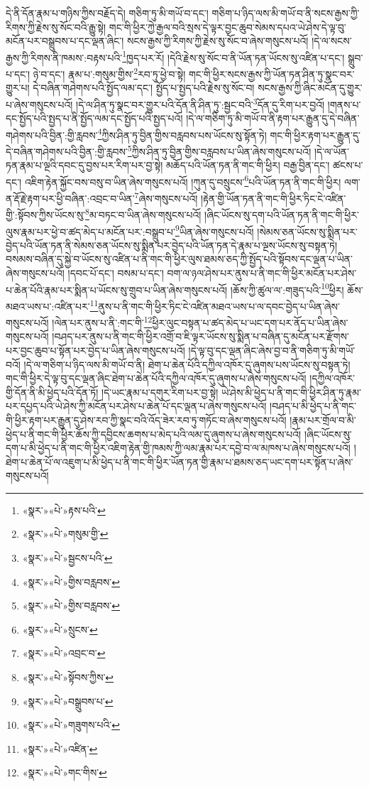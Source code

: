 དེ་ནི་དོན་རྣམ་པ་གཉིས་ཀྱིས་བརྗོད་དེ། གཅིག་ཏུ་མི་གཡོ་བ་དང་། གཅིག་པ་ཉིད་ལས་མི་གཡོ་བ་ནི་སངས་རྒྱས་ཀྱི་རིགས་ཀྱི་རྗེས་སུ་སོང་བའི་རྒྱུ་སྟེ། གང་གི་ཕྱིར་ཀྱེ་རྒྱལ་བའི་སྲས་དེ་ལྟར་བྱང་ཆུབ་སེམས་དཔའ་ཡེ་ཤེས་དེ་ལྟ་བུ་མངོན་པར་བསྒྲུབས་པ་དང་ལྡན་ཞིང་། སངས་རྒྱས་ཀྱི་རིགས་ཀྱི་རྗེས་སུ་སོང་བ་ཞེས་གསུངས་པའོ། །དེ་ལ་སངས་རྒྱས་ཀྱི་རིགས་ནི་ཁམས་:བརྟས་པའི་\footnote{«སྣར་»«པེ་»རྟས་པའི་}ཁྱད་པར་རོ། །དེའི་རྗེས་སུ་སོང་བ་ནི་ཡོན་ཏན་ཡོངས་སུ་འཛིན་པ་དང་། སྒྲུབ་པ་དང་། ཉེ་བ་དང་། རྣམ་པ་:གསུམ་གྱིས་\footnote{«སྣར་»«པེ་»གསུམ་གྱི་}རབ་ཏུ་ཕྱེ་བ་སྟེ། གང་གི་ཕྱིར་སངས་རྒྱས་ཀྱི་ཡོན་ཏན་ཤིན་ཏུ་སྣང་བར་གྱུར་པ། དེ་བཞིན་གཤེགས་པའི་སྤྱོད་ལམ་དང་། སྤྱོད་པ་སྤྱད་པའི་རྗེས་སུ་སོང་བ། སངས་རྒྱས་ཀྱི་ཞིང་མངོན་དུ་གྱུར་པ་ཞེས་གསུངས་པའོ། །དེ་ལ་ཤིན་ཏུ་སྣང་བར་གྱུར་པའི་དོན་ནི་ཤིན་ཏུ་:སྦྱང་བའི་\footnote{«སྣར་»«པེ་»སྦྱངས་པའི་}དོན་དུ་རིག་པར་བྱའོ། །གནས་པ་དང་སྤྱོད་པའི་སྤྱད་པ་ནི་སྤྱོད་ལམ་དང་སྤྱོད་པའི་སྤྱད་པའོ། །དེ་ལ་གཅིག་ཏུ་མི་གཡོ་བ་ནི་རྟག་པར་རྒྱུན་དུ་དེ་བཞིན་གཤེགས་པའི་བྱིན་:གྱི་རླབས་\footnote{«སྣར་»«པེ་»གྱིས་བརླབས་}ཀྱིས་ཤིན་ཏུ་བྱིན་གྱིས་བརླབས་པས་ཡོངས་སུ་སྟོན་ཏེ། གང་གི་ཕྱིར་རྟག་པར་རྒྱུན་དུ་དེ་བཞིན་གཤེགས་པའི་བྱིན་:གྱི་རླབས་\footnote{«སྣར་»«པེ་»གྱིས་བརླབས་}ཀྱིས་ཤིན་ཏུ་བྱིན་གྱིས་བརླབས་པ་ཡིན་ཞེས་གསུངས་པའོ། །དེ་ལ་ཡོན་ཏན་རྣམ་པ་ལྔའི་དབང་དུ་བྱས་པར་རིག་པར་བྱ་སྟེ། མཆོད་པའི་ཡོན་ཏན་ནི་གང་གི་ཕྱིར། བརྒྱ་བྱིན་དང་། ཚངས་པ་དང་། འཇིག་རྟེན་སྐྱོང་བས་བསུ་བ་ཡིན་ཞེས་གསུངས་པའོ། །ཀུན་དུ་བསྲུངས་\footnote{«སྣར་»«པེ་»སྲུངས་}པའི་ཡོན་ཏན་ནི་གང་གི་ཕྱིར། ལག་ན་རྡོ་རྗེ་རྟག་པར་ཕྱི་བཞིན་:འབྲང་བ་ཡིན་\footnote{«སྣར་»«པེ་»འབྲང་བ་}ཞེས་གསུངས་པའོ། །རྟེན་གྱི་ཡོན་ཏན་ནི་གང་གི་ཕྱིར་ཏིང་ངེ་འཛིན་གྱི་:སྟོབས་ཀྱིས་ཡོངས་སུ་\footnote{«སྣར་»«པེ་»སྟོབས་ཀྱིས་}མ་བཏང་བ་ཡིན་ཞེས་གསུངས་པའོ། །ཞིང་ཡོངས་སུ་དག་པའི་ཡོན་ཏན་ནི་གང་གི་ཕྱིར་ལུས་རྣམ་པར་ཕྱེ་བ་ཚད་མེད་པ་མངོན་པར་:བསྒྲུབ་པ་\footnote{«སྣར་»«པེ་»བསྒྲུབས་པ་}ཡིན་ཞེས་གསུངས་པའོ། །སེམས་ཅན་ཡོངས་སུ་སྨིན་པར་བྱེད་པའི་ཡོན་ཏན་ནི་སེམས་ཅན་ཡོངས་སུ་སྨིན་པར་བྱེད་པའི་ཡོན་ཏན་དེ་རྣམ་པ་ལྔས་ཡོངས་སུ་བསྟན་ཏེ། བསམས་བཞིན་དུ་སྐྱེ་བ་ཡོངས་སུ་འཛིན་པ་ནི་གང་གི་ཕྱིར་ལུས་ཐམས་ཅད་ཀྱི་སྤྱོད་པའི་སྟོབས་དང་ལྡན་པ་ཡིན་ཞེས་གསུངས་པའོ། །དབང་པོ་དང་། བསམ་པ་དང་། བག་ལ་ཉལ་ཤེས་པར་ནུས་པ་ནི་གང་གི་ཕྱིར་མངོན་པར་ཤེས་པ་ཆེན་པོའི་རྣམ་པར་སྨིན་པ་ཡོངས་སུ་གྲུབ་པ་ཡིན་ཞེས་གསུངས་པའོ། །ཆོས་ཀྱི་ཚུལ་ལ་:གཟུད་པའི་\footnote{«སྣར་»«པེ་»གཟུགས་པའི་}ཕྱིར། ཆོས་མཐའ་ཡས་པ་:འཛིན་པར་\footnote{«སྣར་»«པེ་»འཛིན་}ནུས་པ་ནི་གང་གི་ཕྱིར་ཏིང་ངེ་འཛིན་མཐའ་ཡས་པ་ལ་དབང་བྱེད་པ་ཡིན་ཞེས་གསུངས་པའོ། །ལེན་པར་ནུས་པ་ནི་:གང་གི་\footnote{«སྣར་»«པེ་»གང་གིས་}ཕྱིར་ལུང་བསྟན་པ་ཚད་མེད་པ་ཡང་དག་པར་ནོད་པ་ཡིན་ཞེས་གསུངས་པའོ། །བཤད་པར་ནུས་པ་ནི་གང་གི་ཕྱིར་འགྲོ་བ་ཇི་ལྟར་ཡོངས་སུ་སྨིན་པ་བཞིན་དུ་མངོན་པར་རྫོགས་པར་བྱང་ཆུབ་པ་སྟོན་པར་བྱེད་པ་ཡིན་ཞེས་གསུངས་པའོ། །དེ་ལྟ་བུ་དང་ལྡན་ཞིང་ཞེས་བྱ་བ་ནི་གཅིག་ཏུ་མི་གཡོ་བའོ། །དེ་ལ་གཅིག་པ་ཉིད་ལས་མི་གཡོ་བ་ནི། ཐེག་པ་ཆེན་པོའི་དཀྱིལ་འཁོར་དུ་ཞུགས་པས་ཡོངས་སུ་བསྟན་ཏེ། གང་གི་ཕྱིར་དེ་ལྟ་བུ་དང་ལྡན་ཞིང་ཐེག་པ་ཆེན་པོའི་དཀྱིལ་འཁོར་དུ་ཞུགས་པ་ཞེས་གསུངས་པའོ། །དཀྱིལ་འཁོར་གྱི་དོན་ནི་མི་ཕྱེད་པའི་དོན་ཏོ། །དེ་ཡང་རྣམ་པ་དགུར་རིག་པར་བྱ་སྟེ། ཡེ་ཤེས་མི་ཕྱེད་པ་ནི་གང་གི་ཕྱིར་ཤིན་ཏུ་རྣམ་པར་དཔྱད་པའི་ཡེ་ཤེས་ཀྱི་མངོན་པར་ཤེས་པ་ཆེན་པོ་དང་ལྡན་པ་ཞེས་གསུངས་པའོ། །བཤད་པ་མི་ཕྱེད་པ་ནི་གང་གི་ཕྱིར་རྟག་པར་རྒྱུན་དུ་ཤེས་རབ་ཀྱི་སྣང་བའི་འོད་ཟེར་རབ་ཏུ་གཏོང་བ་ཞེས་གསུངས་པའོ། །རྣམ་པར་གྲོལ་བ་མི་ཕྱེད་པ་ནི་གང་གི་ཕྱིར་ཆོས་ཀྱི་དབྱིངས་ཆགས་པ་མེད་པའི་ལམ་དུ་ཞུགས་པ་ཞེས་གསུངས་པའོ། །ཞིང་ཡོངས་སུ་དག་པ་མི་ཕྱེད་པ་ནི་གང་གི་ཕྱིར་འཇིག་རྟེན་གྱི་ཁམས་ཀྱི་ལམ་རྣམ་པར་དབྱེ་བ་ལ་མཁས་པ་ཞེས་གསུངས་པའོ། །ཐེག་པ་ཆེན་པོ་ལ་འཇུག་པ་མི་ཕྱེད་པ་ནི་གང་གི་ཕྱིར་ཡོན་ཏན་གྱི་རྣམ་པ་ཐམས་ཅད་ཡང་དག་པར་སྟོན་པ་ཞེས་གསུངས་པའོ། 